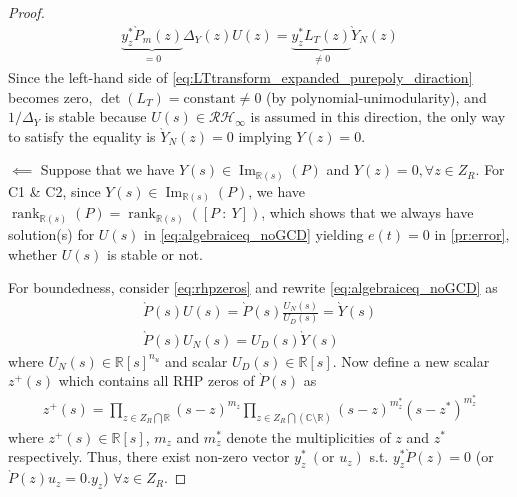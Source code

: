 \documentclass[10pt,a4paper]{amsart}
\theoremstyle{remark}
\DeclareMathOperator*{\rank}{rank}
\DeclareMathOperator*{\im}{Im}
\begin{document}
\begin{proof}
\begin{align} 
\label{eq:LTtransform_expanded_purepoly_diraction}
\underbrace{y^*_z\grave{P}_m(z)}_{=0}\Delta_Y(z)U(z)=\underbrace{y^*_zL_T(z)}_{\ne 0}\grave{Y}_N(z)
\end{align}
Since the left-hand side of \eqref{eq:LTtransform_expanded_purepoly_diraction} becomes zero, $\det(L_T) = \text{constant} \ne 0$ (by polynomial-unimodularity), and $1/\Delta_Y$ is stable because $U(s) \in \mathcal{RH}_\infty$ is assumed in this direction, the only way to satisfy the equality is $\grave{Y}_N(z)=0$ implying $Y(z)=0$. 

$\impliedby$ Suppose that we have $Y(s) \in \im_{\mathbb{R}(s)}(P)$ and $Y(z)=0, \forall z \in Z_R$. For C1 \& C2, since $Y(s) \in \im_{\mathbb{R}(s)}(P)$, we have $\rank_{\mathbb{R}(s)}(P)=\rank_{\mathbb{R}(s)}([P\ : \ Y])$, which shows that we always have solution(s) for $U(s)$ in \eqref{eq:algebraiceq_noGCD} yielding $e(t)=0$ in \eqref{pr:error}, whether $U(s)$ is stable or not.

For boundedness, consider \eqref{eq:rhpzeros} and rewrite \eqref{eq:algebraiceq_noGCD} as 
\begin{align} \label{eq:algebraiceq_noGCD_Ufactored}
    \grave{P}(s)U(s) = \grave{P}(s)\frac{U_N(s)}{U_D(s)} = \grave{Y}(s) \\
    \grave{P}(s)U_N(s)=U_D(s)\grave{Y}(s) \label{eq:algebraiceq_noGCD_Ufactored2}
\end{align}
where $U_N(s) \in \mathbb{R}[s]^{n_u}$ and scalar $U_D(s) \in \mathbb{R}[s]$. Now define a new scalar $z^+(s)$ which contains all RHP zeros of $\grave{P}(s)$ as
 \begin{align*} 
    z^+(s)=\prod_{z \in Z_R \bigcap \mathbb{R}}(s - z)^{m_z}\prod_{z \in Z_R\bigcap (\mathbb{C}\setminus \mathbb{R})}(s - z)^{m_z^\ast} (s - {z}^\ast)^{m_z^\ast}
\end{align*} 
where $z^+(s) \in \mathbb{R}[s]$, $m_z$ and $m_z^\ast$ denote the multiplicities of $z$ and ${z}^*$ respectively. Thus, there exist non-zero vector $y^\ast_z \ (\text{or } u_z)$ s.t. $y^\ast_z\grave{P}(z)=0 $ (or $ \grave{P}(z)u_z=0.y_z$) $\forall z \in Z_R$. 


\end{proof}
\end{document}
